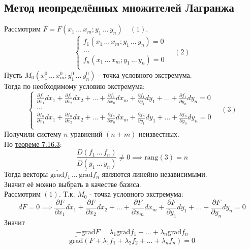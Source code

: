 \documentclass[12pt]{article}
\begin{document}
    \subsection{Метод неопределённых множителей Лагранжа}\noindent
    Рассмотрим $F = F(x_1\, \dots\, x_m; y_1\, \dots\, y_n) \quad (1)$.
    \[ \begin{cases}
        f_1(x_1\, \dots\, x_m; y_1\, \dots\, y_n) = 0\\
        \dots\\
        f_n(x_1\, \dots\, x_m; y_1\, \dots\, y_n) = 0\\
    \end{cases} \quad (2) \]
    Пусть $M_0 (x^0_1\, \dots\, x^0_m; y^0_1\, \dots\, y^0_n)$ - точка условного экстремума.\\
    Тогда по необходимому условию экстремума:
    \[ 
        \begin{cases}
            \frac{\partial f_1}{\partial x_1}dx_1 + \frac{\partial f_1}{\partial x_2}dx_2 + \dots + \frac{\partial f_1}{\partial x_n}dx_m + \frac{\partial f_1}{\partial y_1}dy_1 + \dots + \frac{\partial f_1}{\partial y_n}dy_n = 0\\
            \dots\\
            \frac{\partial f_n}{\partial x_1}dx_1 + \frac{\partial f_n}{\partial x_2}dx_2 + \dots + \frac{\partial f_n}{\partial x_n}dx_m + \frac{\partial f_n}{\partial y_1}dy_1 + \dots + \frac{\partial f_n}{\partial y_n}dy_n = 0\\
        \end{cases} \quad (3)
    \]
    Получили систему $n$ уравнений $(n + m)$ неизвестных.\\
    По \hyperref[th:7.16.3]{теореме 7.16.3}:
    \[ \frac{D(f_1\, \dots\, f_n)}{D(y_1\, \dots\, y_n)} \ne 0 \implies \text{rang}(3) = n \]
    Тогда векторы $\overline{\text{grad}}f_1\, \dots\, \overline{\text{grad}}f_n$ являются линейно независимыми.\\
    Значит её можно выбрать в качестве базиса.\\
    Рассмотрим $(1)$. Т.к. $M_0$ - точка условного экстремума:
    \[ dF = 0 \implies \frac{\partial F}{\partial x_1}dx_1 + \frac{\partial F}{\partial x_2}dx_2 + \dots + \frac{\partial F}{\partial x_m}dx_m + \frac{\partial F}{\partial y_1}dy_1 + \dots + \frac{\partial F}{\partial y_n}dy_n = 0 \]
    Значит 
    \[ -\overline{\text{grad}}F = \lambda_1 \overline{\text{grad}}f_1 + \dots + \lambda_n \overline{\text{grad}}f_n \]
    \[ \overline{\text{grad}}(F + \lambda_1 f_1 + \lambda_2 f_2 + \dots + \lambda_n f_n) = 0 \]
\end{document}
